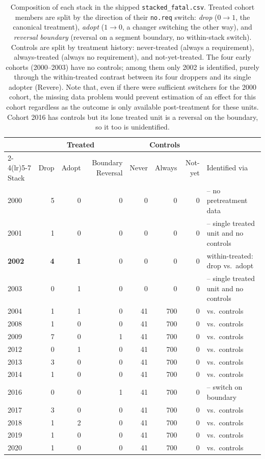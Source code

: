 \begin{table}[!htb]\centering
\caption{Composition of each stack in the shipped \texttt{stacked\_fatal.csv}.
Treated cohort members are split by the direction of their \texttt{no.req}
switch: \emph{drop} ($0\!\to\!1$, the canonical treatment), \emph{adopt}
($1\!\to\!0$, a changer switching the other way), and \emph{reversal boundary}
(reversal on a segment boundary, no within-stack switch). Controls are split by
treatment history: never-treated (always a requirement), always-treated (always
no requirement), and not-yet-treated. The four early cohorts (2000--2003) have no
controls; among them only 2002 is identified, purely through the within-treated
contrast between its four droppers and its single adopter (Revere). Note that, even if there were sufficient switchers for the 2000 cohort, the missing data problem would prevent estimation of an effect for this cohort regardless as the outcome is only available post-treatment for these units. Cohort 2016 has controls but its lone treated unit is a reversal on the boundary, so it too is unidentified.}
\label{tab:stack-composition}
\begin{tabular}{lrrrrrrl}
\toprule
& \multicolumn{3}{c}{Treated} & \multicolumn{3}{c}{Controls} & \\
\cmidrule(lr){2-4}\cmidrule(lr){5-7}
Stack & Drop & Adopt & Boundary Reversal & Never & Always & Not-yet & Identified via \\
\midrule
2000 & 5 & 0 & 0 & 0 & 0 & 0 & -- no pretreatment data\\
2001 & 1 & 0 & 0 & 0 & 0 & 0 & -- single treated unit and no controls \\
\textbf{2002} & \textbf{4} & \textbf{1} & 0 & 0 & 0 & 0 & within-treated: drop vs.\ adopt \\
2003 & 0 & 1 & 0 & 0 & 0 & 0 & -- single treated unit and no controls \\
2004 & 1 & 1 & 0 & 41 & 700 & 0 & vs.\ controls \\
2008 & 1 & 0 & 0 & 41 & 700 & 0 & vs.\ controls \\
2009 & 7 & 0 & 1 & 41 & 700 & 0 & vs.\ controls \\
2012 & 0 & 1 & 0 & 41 & 700 & 0 & vs.\ controls \\
2013 & 3 & 0 & 0 & 41 & 700 & 0 & vs.\ controls \\
2014 & 1 & 0 & 0 & 41 & 700 & 0 & vs.\ controls \\
2016 & 0 & 0 & 1 & 41 & 700 & 0 & -- switch on boundary \\
2017 & 3 & 0 & 0 & 41 & 700 & 0 & vs.\ controls \\
2018 & 1 & 2 & 0 & 41 & 700 & 0 & vs.\ controls \\
2019 & 1 & 0 & 0 & 41 & 700 & 0 & vs.\ controls \\
2020 & 1 & 0 & 0 & 41 & 700 & 0 & vs.\ controls \\
\bottomrule
\end{tabular}
\end{table}

